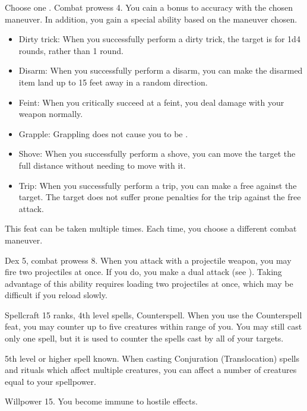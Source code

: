 Choose one .
\featpre Combat prowess 4.
\featben You cain a  bonus to accuracy with the chosen maneuver.
In addition, you gain a special ability based on the maneuver chosen.
\begin{itemize}
    \item Dirty trick: When you successfully perform a dirty trick, the target is \impaired for 1d4 rounds, rather than 1 round.
    \item Disarm: When you successfully perform a disarm, you can make the disarmed item land up to 15 feet away in a random direction.
    \item Feint: When you critically succeed at a feint, you deal damage with your weapon normally.
    \item Grapple: Grappling does not cause you to be .
    \item Shove: When you successfully perform a shove, you can move the target the full distance without needing to move with it.
    \item Trip: When you successfully perform a trip, you can make a free  against the target. The target does not suffer prone penalties for the trip against the free attack.
\end{itemize}
 This feat can be taken multiple times.
Each time, you choose a different combat maneuver.

\featpres Dex 5, combat prowess 8.
\featben When you attack with a projectile weapon, you may fire two projectiles at once.
If you do, you make a dual attack (see ).
Taking advantage of this ability requires loading two projectiles at once, which may be difficult if you reload slowly.

\featpres Spellcraft 15 ranks, 4th level spells, Counterspell.
\featben When you use the Counterspell feat, you may counter up to five creatures within \rngmed range of you.
You may still cast only one spell, but it is used to counter the spells cast by all of your targets.

\featpre 5th level or higher  spell known.
\featben When casting Conjuration (Translocation) spells and rituals which affect multiple creatures, you can affect a number of creatures equal to your spellpower.

\featpre Willpower 15.
\featben You become immune to hostile  effects.

